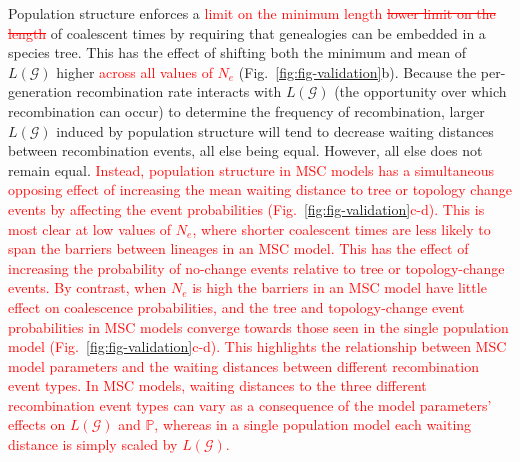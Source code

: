 \documentclass[11pt]{article}
\begin{document}
Population structure enforces a 
\textcolor{red}{limit on the minimum length
\sout{lower limit on the length}} of coalescent 
times by requiring that genealogies can be embedded in a species tree.
This has the effect of shifting both the minimum and mean of 
$L(\mathcal{G})$ higher 
\textcolor{red}{across all values of $N_e$}
(Fig.~\ref{fig:fig-validation}b). 
Because the per-generation recombination rate interacts with
$L(\mathcal{G})$ (the opportunity over which recombination can occur) to
determine the frequency of recombination, larger $L(\mathcal{G})$ induced
by population structure will tend to decrease waiting distances between 
recombination events, all else being equal. 
% 
% 
However, all else does not remain equal.
% 
\textcolor{red}{
Instead, population structure in MSC models has a simultaneous opposing effect
of increasing the mean waiting distance to tree or topology change events by 
affecting the event probabilities
(Fig.~\ref{fig:fig-validation}c-d).
This is most clear at low values of $N_e$, where shorter coalescent times are
less likely to span the barriers between lineages in an MSC model. 
This has the effect of increasing the probability of no-change events
relative to tree or topology-change events. By contrast, when $N_e$ is high the 
barriers in an MSC model have little effect on coalescence probabilities, and 
the tree and topology-change event probabilities in MSC models converge towards 
those seen in the single population model
(Fig.~\ref{fig:fig-validation}c-d). 
% 
This highlights the relationship between MSC model parameters and the waiting 
distances between different recombination event types. In MSC models, waiting
distances to the three different recombination event types can vary as a 
consequence of the model parameters' effects on $L(\mathcal{G})$ and $\mathbb{P}$, 
whereas in a single population model each waiting distance is simply scaled 
by $L(\mathcal{G})$.
}
\end{document}
